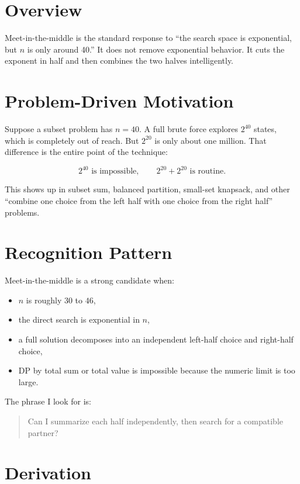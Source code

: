 \section*{Overview}

Meet-in-the-middle is the standard response to ``the search space is exponential, but \(n\) is only around 40.'' It
does not remove exponential behavior. It cuts the exponent in half and then combines the two halves intelligently.

\section*{Problem-Driven Motivation}

Suppose a subset problem has \(n = 40\). A full brute force explores \(2^{40}\) states, which is completely out of
reach. But \(2^{20}\) is only about one million. That difference is the entire point of the technique:

\[
2^{40} \text{ is impossible},\qquad
2^{20} + 2^{20} \text{ is routine}.
\]

This shows up in subset sum, balanced partition, small-set knapsack, and other ``combine one choice from the left half
with one choice from the right half'' problems.

\section*{Recognition Pattern}

Meet-in-the-middle is a strong candidate when:

\begin{itemize}
  \item \(n\) is roughly \(30\) to \(46\),
  \item the direct search is exponential in \(n\),
  \item a full solution decomposes into an independent left-half choice and right-half choice,
  \item DP by total sum or total value is impossible because the numeric limit is too large.
\end{itemize}

The phrase I look for is:

\begin{quote}
Can I summarize each half independently, then search for a compatible partner?
\end{quote}

\section*{Derivation}

